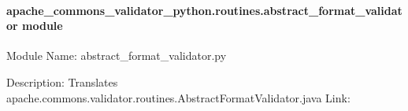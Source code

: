 \documentclass[letterpaper,10pt,english]{sphinxmanual}
\begin{document}
\begin{fulllineitems}
\begin{fulllineitems}
\label{\detokenize{apache_commons_validator_python.routines:id1}}
\pysigstartsignatures
{}
\pysigstopsignatures
\end{fulllineitems}


\end{fulllineitems}



\paragraph{apache\_commons\_validator\_python.routines.abstract\_format\_validator module}
\label{\detokenize{apache_commons_validator_python.routines:module-apache_commons_validator_python.routines.abstract_format_validator}}\label{\detokenize{apache_commons_validator_python.routines:apache-commons-validator-python-routines-abstract-format-validator-module}}
\sphinxAtStartPar
Module Name: abstract\_format\_validator.py

\sphinxAtStartPar
Description: Translates apache.commons.validator.routines.AbstractFormatValidator.java
Link: 
\end{document}
